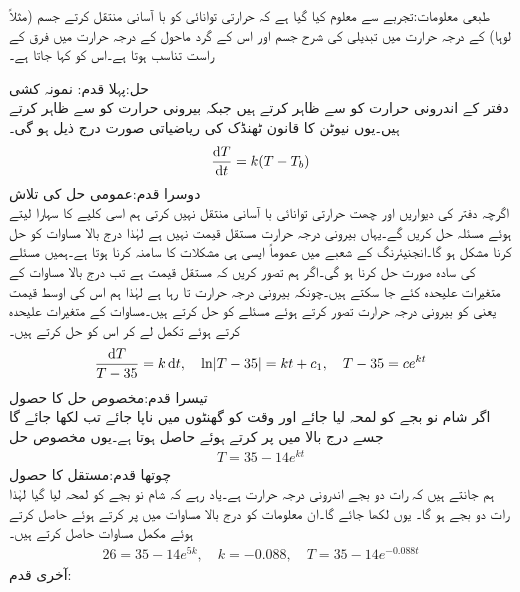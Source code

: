 طبعی معلومات:تجربے سے معلوم کیا گیا ہے کہ حرارتی توانائی کو با آسانی منتقل کرتے جسم (مثلاً لوہا) کے درجہ حرارت میں تبدیلی کی شرح جسم اور اس کے گرد ماحول کے درجہ حرارت میں فرق کے راست تناسب  ہوتا ہے۔اس کو  کہا جاتا ہے۔

حل:پہلا قدم: نمونہ کشی \\
دفتر کے اندرونی حرارت کو  سے ظاہر کرتے ہیں جبکہ بیرونی حرارت کو  سے ظاہر کرتے ہیں۔یوں نیوٹن کا قانون ٹھنڈک کی ریاضیاتی صورت درج ذیل ہو گی۔
\begin{align}
\frac{\dif T}{\dif t}=k(T-T_b)
\end{align}
دوسرا قدم:عمومی حل کی تلاش\\
اگرچہ دفتر کی دیواریں اور چھت حرارتی توانائی با آسانی منتقل نہیں کرتی ہم اسی کلیے کا سہارا لیتے ہوئے مسئلہ حل کریں گے۔یہاں بیرونی درجہ حرارت مستقل قیمت نہیں ہے لہٰذا درج بالا مساوات کو حل کرنا مشکل ہو گا۔انجنیئرنگ کے شعبے میں عموماً ایسی ہی مشکلات کا سامنہ کرنا ہوتا ہے۔ہمیں مسئلے کی سادہ صورت حل کرنا ہو گی۔اگر ہم تصور کریں کہ  مستقل قیمت ہے تب درج بالا مساوات کے متغیرات علیحدہ کئے جا سکتے ہیں۔چونکہ بیرونی درجہ حرارت  تا  رہا ہے لہٰذا ہم اس کی اوسط قیمت یعنی  کو بیرونی درجہ حرارت تصور کرتے ہوئے مسئلے کو حل کرتے ہیں۔مساوات کے متغیرات علیحدہ کرتے ہوئے تکمل لے کر اس کو حل کرتے ہیں۔
\begin{align*}
\frac{\dif T}{T-35}=k\dif t, \quad \ln\abs{T-35}=kt+c_1,\quad T-35=ce^{kt}
\end{align*}
تیسرا قدم:مخصوص حل کا حصول\\
اگر شام نو بجے کو لمحہ  لیا جائے اور وقت کو گھنٹوں میں ناپا جائے تب  لکھا جائے گا جسے درج بالا میں پر کرتے ہوئے  حاصل ہوتا ہے۔یوں مخصوص حل
\begin{align*}
T=35-14e^{kt}
\end{align*}
چوتھا قدم:مستقل  کا حصول\\
ہم جانتے ہیں کہ رات دو بجے  اندرونی درجہ حرارت   ہے۔یاد رہے کہ شام نو بجے کو لمحہ  لیا گیا لہٰذا رات دو بجے  ہو گا۔
یوں  لکھا جائے گا۔ان معلومات کو درج بالا مساوات میں پر کرتے ہوئے  حاصل کرتے ہوئے مکمل مساوات حاصل کرتے ہیں۔
\begin{align*}
26=35-14e^{5k},\quad k=-0.088, \quad T=35-14e^{-0.088t}
\end{align*}
آخری قدم:\\
